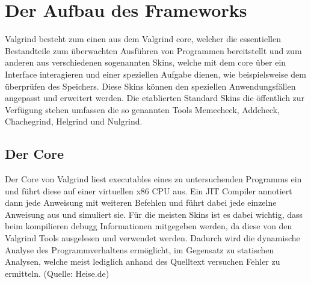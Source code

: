 \section{Der Aufbau des Frameworks}
Valgrind besteht zum einen aus dem Valgrind core, welcher die essentiellen Bestandteile zum überwachten Ausführen von Programmen bereitstellt und zum anderen aus verschiedenen sogenannten Skins, welche mit dem core über ein Interface interagieren und einer speziellen Aufgabe dienen, wie beispielsweise dem überprüfen des Speichers. Diese Skins können den speziellen Anwendungsfällen angepasst und erweitert werden. Die etablierten Standard Skins die öffentlich zur Verfügung stehen umfassen die so genannten Tools Memecheck, Addcheck, Chachegrind, Helgrind und Nulgrind.

\subsection{Der Core}
Der Core von Valgrind liest executables eines zu untersuchenden Programms ein und führt diese auf einer virtuellen x86 CPU aus. Ein JIT Compiler annotiert dann jede Anweisung mit weiteren Befehlen und führt dabei jede einzelne Anweisung aus und simuliert sie. Für die meisten Skins ist es dabei wichtig, dass beim kompilieren debugg Informationen mitgegeben werden, da diese von den Valgrind Tools ausgelesen und verwendet werden. Dadurch wird die dynamische Analyse des Programmverhaltens ermöglicht, im Gegensatz zu statischen Analysen, welche meist lediglich anhand des Quelltext versuchen Fehler zu ermitteln. (Quelle: Heise.de)